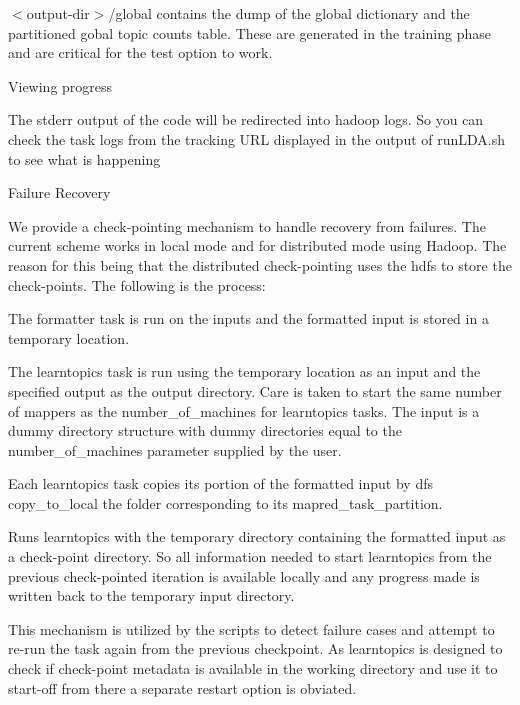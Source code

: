 \begin{DoxyEnumerate}
\begin{DoxyEnumerate}
\begin{DoxyEnumerate}
$<$output-\/dir$>$/global contains the dump of the global dictionary and the partitioned gobal topic counts table. These are generated in the training phase and are critical for the test option to work. 
\end{DoxyEnumerate}
\item 

Viewing progress 
\begin{DoxyEnumerate}
\item 

The stderr output of the code will be redirected into hadoop logs. So you can check the task logs from the tracking URL displayed in the output of runLDA.sh to see what is happening 
\end{DoxyEnumerate}
\item 

Failure Recovery 

We provide a check-\/pointing mechanism to handle recovery from failures. The current scheme works in local mode and for distributed mode using Hadoop. The reason for this being that the distributed check-\/pointing uses the hdfs to store the check-\/points. The following is the process:  
\begin{DoxyEnumerate}
\item The formatter task is run on the inputs and the formatted input is stored in a temporary location. 
\item The learntopics task is run using the temporary location as an input and the specified output as the output directory. Care is taken to start the same number of mappers as the number\_\-of\_\-machines for learntopics tasks. The input is a dummy directory structure with dummy directories equal to the number\_\-of\_\-machines parameter supplied by the user. 
\item Each learntopics task copies its portion of the formatted input by dfs copy\_\-to\_\-local the folder corresponding to its mapred\_\-task\_\-partition. 
\item Runs learntopics with the temporary directory containing the formatted input as a check-\/point directory. So all information needed to start learntopics from the previous check-\/pointed iteration is available locally and any progress made is written back to the temporary input directory. 
\end{DoxyEnumerate}

This mechanism is utilized by the scripts to detect failure cases and attempt to re-\/run the task again from the previous checkpoint. As learntopics is designed to check if check-\/point metadata is available in the working directory and use it to start-\/off from there a separate restart option is obviated.  


\end{DoxyEnumerate}
\end{DoxyEnumerate}

